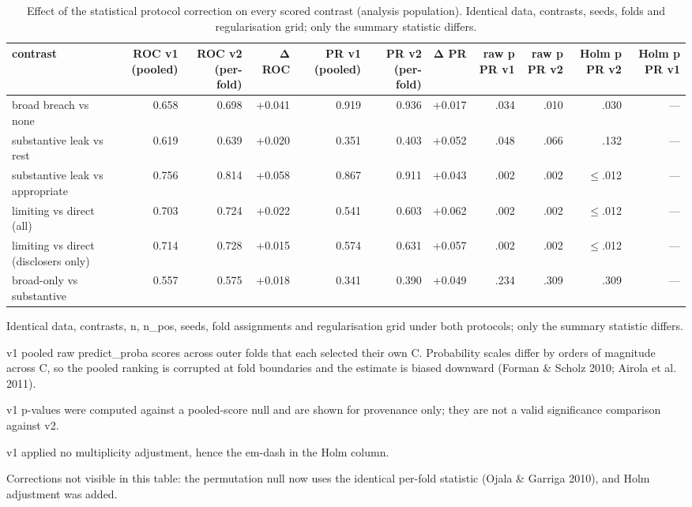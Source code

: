 \begin{table}[t]
\centering
\begin{threeparttable}
\caption{Effect of the statistical protocol correction on every scored contrast (analysis population). Identical data, contrasts, seeds, folds and regularisation grid; only the summary statistic differs.}
\label{tab:tab-protocol-correction-v1-v2}
\small
\begin{tabular}{lrrrrrrrrrr}
\toprule
contrast & ROC v1 (pooled) & ROC v2 (per-fold) & Δ ROC & PR v1 (pooled) & PR v2 (per-fold) & Δ PR & raw p PR v1 & raw p PR v2 & Holm p PR v2 & Holm p PR v1 \\
\midrule
broad breach vs none & 0.658 & 0.698 & +0.041 & 0.919 & 0.936 & +0.017 & .034 & .010 & .030 & --- \\
substantive leak vs rest & 0.619 & 0.639 & +0.020 & 0.351 & 0.403 & +0.052 & .048 & .066 & .132 & --- \\
substantive leak vs appropriate & 0.756 & 0.814 & +0.058 & 0.867 & 0.911 & +0.043 & .002 & .002 & $\leq$.012 & --- \\
limiting vs direct (all) & 0.703 & 0.724 & +0.022 & 0.541 & 0.603 & +0.062 & .002 & .002 & $\leq$.012 & --- \\
limiting vs direct (disclosers only) & 0.714 & 0.728 & +0.015 & 0.574 & 0.631 & +0.057 & .002 & .002 & $\leq$.012 & --- \\
broad-only vs substantive & 0.557 & 0.575 & +0.018 & 0.341 & 0.390 & +0.049 & .234 & .309 & .309 & --- \\
\bottomrule
\end{tabular}
\begin{tablenotes}[flushleft]\footnotesize
\item Identical data, contrasts, n, n\_pos, seeds, fold assignments and regularisation grid under both protocols; only the summary statistic differs.
\item v1 pooled raw predict\_proba scores across outer folds that each selected their own C. Probability scales differ by orders of magnitude across C, so the pooled ranking is corrupted at fold boundaries and the estimate is biased downward (Forman \& Scholz 2010; Airola et al. 2011).
\item v1 p-values were computed against a pooled-score null and are shown for provenance only; they are not a valid significance comparison against v2.
\item v1 applied no multiplicity adjustment, hence the em-dash in the Holm column.
\item Corrections not visible in this table: the permutation null now uses the identical per-fold statistic (Ojala \& Garriga 2010), and Holm adjustment was added.
\end{tablenotes}
\end{threeparttable}
\end{table}
